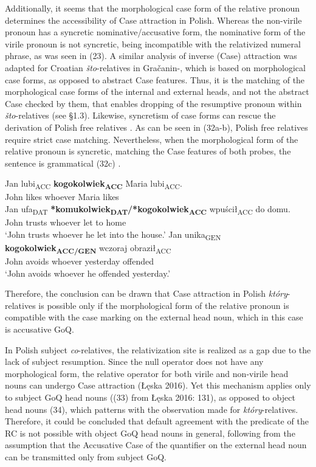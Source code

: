 \documentclass[output=paper]{langsci/langscibook}
\begin{document}
Additionally, it seems that the morphological case form of the relative pronoun determines the accessibility of Case attraction in Polish. Whereas the non-virile pronoun has a syncretic nominative/accusative form, the nominative form of the virile pronoun is not syncretic, being incompatible with the relativized numeral phrase, as was seen in (23). A similar analysis of inverse (Case) attraction was adapted for Croatian \textit{što}{}-relatives in Gračanin-\citet{Yuksek2013}, which is based on morphological case forms, as opposed to abstract Case features. Thus, it is the matching of the morphological case forms of the internal and external heads, and not the abstract Case checked by them, that enables dropping of the resumptive pronoun within \textit{što}{}-relatives (see §1.3). Likewise, syncretism of case forms can rescue the derivation of Polish free relatives \citep{Assmann2014}. As can be seen in (32a-b), Polish free relatives require strict case matching. Nevertheless, when the morphological form of the relative pronoun is syncretic, matching the Case features of both probes, the sentence is grammatical (32c) \citep[3]{Assmann2014}. 

\ea%
    \label{ex:leska:32}
    \ea
    \gll Jan   lubi\textsubscript{ACC}   \textbf{kogokolwiek\textsubscript{ACC}}   Maria lubi\textsubscript{ACC}.\\
         John   likes     whoever     Maria likes\\
    \ex
    \gll Jan  ufa\textsubscript{DAT}   \textbf{*komukolwiek\textsubscript{DAT}}\textbf{/*kogokolwiek\textsubscript{ACC}} wpuścił\textsubscript{ACC}   do   domu.\\
         John   trusts     whoever   let     to   home\\
    \glt ‘John trusts whoever he let into the house.’
    \ex
    \gll Jan   unika\textsubscript{GEN}   \textbf{kogokolwiek\textsubscript{ACC/GEN}} wczoraj   obraził\textsubscript{ACC}\\
         John   avoids   whoever       yesterday   offended\\
    \glt ‘John avoids whoever he offended yesterday.’
    \z
\z    

Therefore, the conclusion can be drawn that Case attraction in Polish \textit{który}{}-relatives is possible only if the morphological form of the relative pronoun is compatible with the case marking on the external head noun, which in this case is accusative GoQ. 

In Polish subject \textit{co}{}-relatives, the relativization site is realized as a gap due to the lack of subject resumption. Since the null operator does not have any morphological form, the relative operator for both virile and non-virile head nouns can undergo Case attraction (Łęska 2016). Yet this mechanism applies only to subject GoQ head nouns ((33) from Łęska 2016: 131), as opposed to object head nouns (34), which patterns with the observation made for \textit{który}{}-relatives. Therefore, it could be concluded that default agreement with the predicate of the RC is not possible with object GoQ head nouns in general, following from the assumption that the Accusative Case of the quantifier on the external head noun can be transmitted only from subject GoQ.
 
\end{document}
